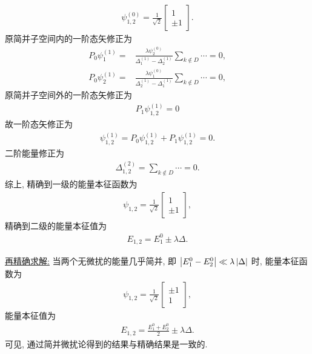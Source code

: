 \documentclass{assignment}
\begin{document}
\begin{sol}
\begin{itemize}
\begin{align}
            \psi_{1,2}^{(0)}=\frac{1}{\sqrt{2}}\begin{bmatrix}
                1\\
                \pm1
            \end{bmatrix}.
        \end{align}
        原简并子空间内的一阶态矢修正为
        \begin{align}
            P_0\psi_1^{(1)}=&\frac{\lambda\psi_2^{(0)}}{\Delta_1^{(1)}-\Delta_2^{(1)}}\sum_{k\notin D}\cdots=0,\\
            P_0\psi_2^{(1)}=&\frac{\lambda\psi_1^{(0)}}{\Delta_2^{(1)}-\Delta_1^{(1)}}\sum_{k\notin D}\cdots=0,
        \end{align}
        原简并子空间外的一阶态矢修正为
        \begin{align}
            P_1\psi_{1,2}^{(1)}=0
        \end{align}
        故一阶态矢修正为
        \begin{align}
            \psi_{1,2}^{(1)}=P_0\psi_{1,2}^{(1)}+P_1\psi_{1,2}^{(1)}=0.
        \end{align}
        二阶能量修正为
        \begin{align}
            \Delta_{1,2}^{(2)}=\sum_{k\notin D}\cdots=0.
        \end{align}
        综上, 精确到一级的能量本征函数为
        \begin{align}
            \psi_{1,2}=\frac{1}{\sqrt{2}}\begin{bmatrix}
                1\\
                \pm 1
            \end{bmatrix},
        \end{align}
        精确到二级的能量本征值为
        \begin{align}
            E_{1,2}=E_1^0\pm\lambda\Delta.
        \end{align}

        \uline{再精确求解:} 当两个无微扰的能量几乎简并, 即 $\left\lvert E_1^0-E_2^0\right\rvert\ll\lambda\left\lvert\Delta\right\rvert$ 时, 能量本征函数为
        \begin{align}
            \psi_{1,2}=\frac{1}{\sqrt{2}}\begin{bmatrix}
                \pm 1\\
                1
            \end{bmatrix},
        \end{align}
        能量本征值为
        \begin{align}
            E_{1,2}=\frac{E_1^0+E_2^0}{2}\pm\lambda\Delta.
        \end{align}
        可见, 通过简并微扰论得到的结果与精确结果是一致的.
    \end{itemize}
\end{sol}
\end{document}
